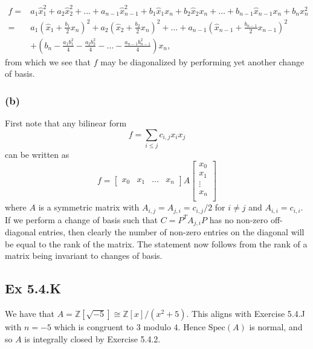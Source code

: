 \documentclass{article}
\theoremstyle{definition}
\newcommand{\Z}{\mathbb{Z}}
\newcommand{\Spec}{\text{Spec}}
\begin{document}
\begin{align*}
	f
	= &
	a_1 \hat{x}_1^{2}
	+
	a_2 \hat{x}_2^{2}
	+
	\ldots
	+
	a_{n - 1} \hat{x}_{n - 1}^{2}
	+
	b_1 \hat{x}_1 x_{n}
	+
	b_2 \hat{x}_2 x_n
	+
	\ldots
	+
	b_{n - 1} \hat{x}_{n - 1} x_n
	+
	b_{n} x_n^{2}                                                          \\
	= &
	a_1 \left(\hat{x}_1 + \frac{b_1}{2} x_n\right)^{2}
	+
	a_2 \left(\hat{x}_2 + \frac{b_2}{2} x_n\right)^{2}
	+
	\ldots
	+
	a_{n - 1} \left(\hat{x}_{n - 1} + \frac{b_{n-1}}{2} x_{n-1}\right)^{2} \\
	  & +
	\left(
	b_n
	-
	\frac{a_1 b_1^2}{4}
	-
	\frac{a_2 b_2^2}{4}
	-
	\ldots
	-
	\frac{a_{n-1} b_{n - 1}^2}{4}
	\right)
	x_n,
\end{align*}
from which we see that $f$ may be diagonalized by performing
yet another change of basis.

\subsubsection*{(b)}

First note that any bilinear form
\[
	f = \sum_{i \leq j} c_{i, j} x_i x_j
\]
can be written as
\[
	f
	=
	\begin{bmatrix}
		x_0 & x_1 & \ldots & x_n
	\end{bmatrix}
	A
	\begin{bmatrix}
		x_0    \\
		x_1    \\
		\vdots \\
		x_n    \\
	\end{bmatrix}
\]
where $A$ is a symmetric matrix with $A_{i,j} = A_{j, i} = c_{i,j}/2$ for $i
	\not = j$ and $A_{i, i} = c_{i, i}$. If we perform a change of basis such that
$C = P^{T} A_{j, i} P$ has no non-zero off-diagonal entries, then clearly the
number of non-zero entries on the diagonal will be equal to the rank of the
matrix. The statement now follows from the rank of a matrix being invariant to
changes of basis.

\subsection*{Ex 5.4.K}

We have that $A = \Z[\sqrt{-5}] \cong \Z[x]/(x^2 + 5)$. This aligns with Exercise
5.4.J with $n = -5$ which is congruent to $3$ modulo $4$. Hence $\Spec(A)$
is normal, and so $A$ is integrally closed by Exercise 5.4.2. \\
\end{document}
